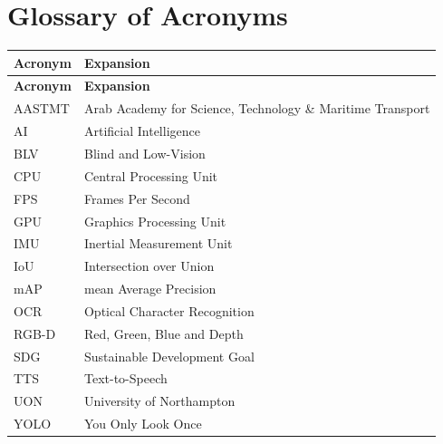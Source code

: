 \clearpage
\chapter*{Glossary of Acronyms}

\begin{longtable}{p{} p{}}
\toprule
\textbf{Acronym} & \textbf{Expansion} \\
\midrule
\endfirsthead
\toprule
\textbf{Acronym} & \textbf{Expansion} \\
\midrule
\endhead
AASTMT & Arab Academy for Science, Technology \& Maritime Transport \\
AI & Artificial Intelligence \\
BLV & Blind and Low-Vision \\
CPU & Central Processing Unit \\
FPS & Frames Per Second \\
GPU & Graphics Processing Unit \\
IMU & Inertial Measurement Unit \\
IoU & Intersection over Union \\
mAP & mean Average Precision \\
OCR & Optical Character Recognition \\
RGB-D & Red, Green, Blue and Depth \\
SDG & Sustainable Development Goal \\
TTS & Text-to-Speech \\
UON & University of Northampton \\
YOLO & You Only Look Once \\
\bottomrule
\end{longtable}
\clearpage

